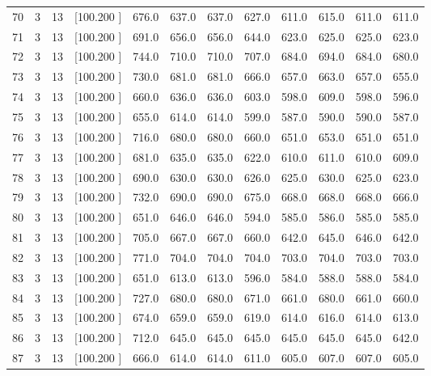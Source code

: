 \documentclass[12pt,a4paper]{article}
\begin{document}
\begin{center}
{\begin{tabular}{r r r r r r r r r r r r}
  70&  3& 13&[100.200   ]&   676.0&   637.0&   637.0&   627.0&   611.0&   615.0&   611.0&   611.0\\[-0.02in]
  71&  3& 13&[100.200   ]&   691.0&   656.0&   656.0&   644.0&   623.0&   625.0&   625.0&   623.0\\[-0.02in]
  72&  3& 13&[100.200   ]&   744.0&   710.0&   710.0&   707.0&   684.0&   694.0&   684.0&   680.0\\[-0.02in]
  73&  3& 13&[100.200   ]&   730.0&   681.0&   681.0&   666.0&   657.0&   663.0&   657.0&   655.0\\[-0.02in]
  74&  3& 13&[100.200   ]&   660.0&   636.0&   636.0&   603.0&   598.0&   609.0&   598.0&   596.0\\[-0.02in]
  75&  3& 13&[100.200   ]&   655.0&   614.0&   614.0&   599.0&   587.0&   590.0&   590.0&   587.0\\[-0.02in]
  76&  3& 13&[100.200   ]&   716.0&   680.0&   680.0&   660.0&   651.0&   653.0&   651.0&   651.0\\[-0.02in]
  77&  3& 13&[100.200   ]&   681.0&   635.0&   635.0&   622.0&   610.0&   611.0&   610.0&   609.0\\[-0.02in]
  78&  3& 13&[100.200   ]&   690.0&   630.0&   630.0&   626.0&   625.0&   630.0&   625.0&   623.0\\[-0.02in]
  79&  3& 13&[100.200   ]&   732.0&   690.0&   690.0&   675.0&   668.0&   668.0&   668.0&   666.0\\[-0.02in]
  80&  3& 13&[100.200   ]&   651.0&   646.0&   646.0&   594.0&   585.0&   586.0&   585.0&   585.0\\[-0.02in]
  81&  3& 13&[100.200   ]&   705.0&   667.0&   667.0&   660.0&   642.0&   645.0&   646.0&   642.0\\[-0.02in]
  82&  3& 13&[100.200   ]&   771.0&   704.0&   704.0&   704.0&   703.0&   704.0&   703.0&   703.0\\[-0.02in]
  83&  3& 13&[100.200   ]&   651.0&   613.0&   613.0&   596.0&   584.0&   588.0&   588.0&   584.0\\[-0.02in]
  84&  3& 13&[100.200   ]&   727.0&   680.0&   680.0&   671.0&   661.0&   680.0&   661.0&   660.0\\[-0.02in]
  85&  3& 13&[100.200   ]&   674.0&   659.0&   659.0&   619.0&   614.0&   616.0&   614.0&   613.0\\[-0.02in]
  86&  3& 13&[100.200   ]&   712.0&   645.0&   645.0&   645.0&   645.0&   645.0&   645.0&   642.0\\[-0.02in]
  87&  3& 13&[100.200   ]&   666.0&   614.0&   614.0&   611.0&   605.0&   607.0&   607.0&   605.0\\[-0.02in]

\end{tabular}}
\end{center}
\end{document}
